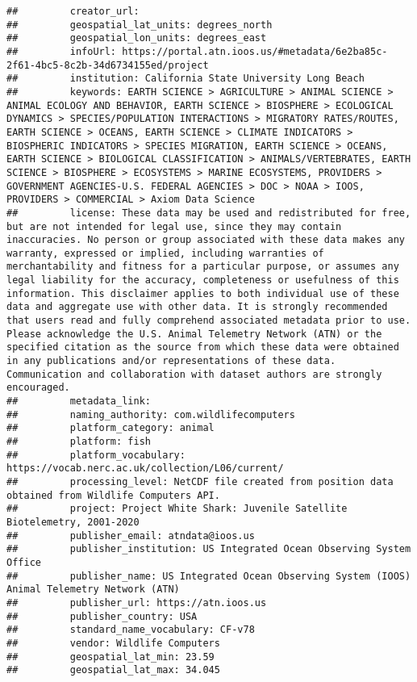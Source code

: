 \documentclass[
]{book}
\begin{document}
\begin{verbatim}
##         creator_url: 
##         geospatial_lat_units: degrees_north
##         geospatial_lon_units: degrees_east
##         infoUrl: https://portal.atn.ioos.us/#metadata/6e2ba85c-2f61-4bc5-8c2b-34d6734155ed/project
##         institution: California State University Long Beach
##         keywords: EARTH SCIENCE > AGRICULTURE > ANIMAL SCIENCE > ANIMAL ECOLOGY AND BEHAVIOR, EARTH SCIENCE > BIOSPHERE > ECOLOGICAL DYNAMICS > SPECIES/POPULATION INTERACTIONS > MIGRATORY RATES/ROUTES, EARTH SCIENCE > OCEANS, EARTH SCIENCE > CLIMATE INDICATORS > BIOSPHERIC INDICATORS > SPECIES MIGRATION, EARTH SCIENCE > OCEANS, EARTH SCIENCE > BIOLOGICAL CLASSIFICATION > ANIMALS/VERTEBRATES, EARTH SCIENCE > BIOSPHERE > ECOSYSTEMS > MARINE ECOSYSTEMS, PROVIDERS > GOVERNMENT AGENCIES-U.S. FEDERAL AGENCIES > DOC > NOAA > IOOS, PROVIDERS > COMMERCIAL > Axiom Data Science
##         license: These data may be used and redistributed for free, but are not intended for legal use, since they may contain inaccuracies. No person or group associated with these data makes any warranty, expressed or implied, including warranties of merchantability and fitness for a particular purpose, or assumes any legal liability for the accuracy, completeness or usefulness of this information. This disclaimer applies to both individual use of these data and aggregate use with other data. It is strongly recommended that users read and fully comprehend associated metadata prior to use. Please acknowledge the U.S. Animal Telemetry Network (ATN) or the specified citation as the source from which these data were obtained in any publications and/or representations of these data. Communication and collaboration with dataset authors are strongly encouraged.
##         metadata_link: 
##         naming_authority: com.wildlifecomputers
##         platform_category: animal
##         platform: fish
##         platform_vocabulary: https://vocab.nerc.ac.uk/collection/L06/current/
##         processing_level: NetCDF file created from position data obtained from Wildlife Computers API.
##         project: Project White Shark: Juvenile Satellite Biotelemetry, 2001-2020
##         publisher_email: atndata@ioos.us
##         publisher_institution: US Integrated Ocean Observing System Office
##         publisher_name: US Integrated Ocean Observing System (IOOS) Animal Telemetry Network (ATN)
##         publisher_url: https://atn.ioos.us
##         publisher_country: USA
##         standard_name_vocabulary: CF-v78
##         vendor: Wildlife Computers
##         geospatial_lat_min: 23.59
##         geospatial_lat_max: 34.045

\end{verbatim}
\end{document}
